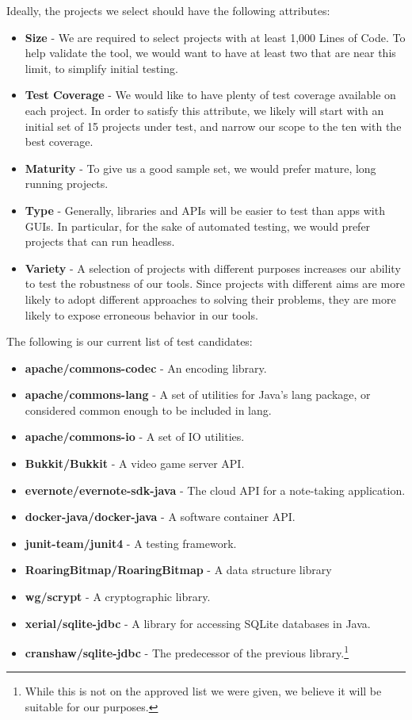Ideally, the projects we select should have the following attributes:

\begin{itemize}
\item \textbf{Size} - We are required to select projects with at least 1,000 Lines of Code. To help validate the tool, we would want to have at least two that are near this limit, to simplify initial testing.
\item \textbf{Test Coverage} - We would like to have plenty of test coverage available on each project. In order to satisfy this attribute, we likely will start with an initial set of 15 projects under test, and narrow our scope to the ten with the best coverage.
\item \textbf{Maturity} - To give us a good sample set, we would prefer mature, long running projects.
\item \textbf{Type} - Generally, libraries and APIs will be easier to test than apps with GUIs. In particular, for the sake of automated testing, we would prefer projects that can run headless.
\item \textbf{Variety} - A selection of projects with different purposes increases our ability to test the robustness of our tools. Since projects with different aims are more likely to adopt different approaches to solving their problems, they are more likely to expose erroneous behavior in our tools.
\end{itemize}

The following is our current list of test candidates:

\begin{itemize}
	\item \textbf{apache/commons-codec} - An encoding library.
    \item \textbf{apache/commons-lang} - A set of utilities for Java's lang package, or considered common enough to be included in lang.
    \item \textbf{apache/commons-io} - A set of IO utilities.
    \item \textbf{Bukkit/Bukkit} - A video game server API.
    \item \textbf{evernote/evernote-sdk-java} - The cloud API for a note-taking application.
    \item \textbf{docker-java/docker-java} - A software container API.
    \item \textbf{junit-team/junit4} - A testing framework.
    \item \textbf{RoaringBitmap/RoaringBitmap} - A data structure library
    \item \textbf{wg/scrypt} - A cryptographic library.
    \item \textbf{xerial/sqlite-jdbc} - A library for accessing SQLite databases in Java.
    \item \textbf{cranshaw/sqlite-jdbc} - The predecessor of the previous library.\footnote{While this is not on the approved list we were given, we believe it will be suitable for our purposes.}
\end{itemize}

